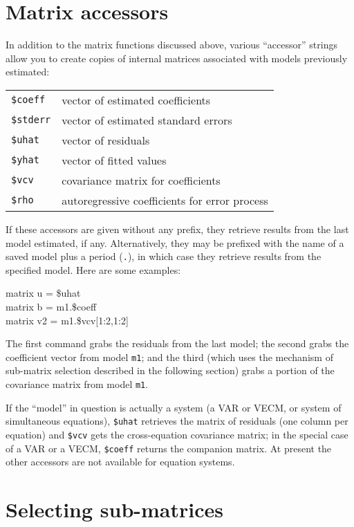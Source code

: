 \section{Matrix accessors}
\label{matrix-accessors}

In addition to the matrix functions discussed above,
various ``accessor'' strings allow you to create copies of internal
matrices associated with models previously estimated:

\begin{center}
\begin{tabular}{ll}
\texttt{\$coeff} & vector of estimated coefficients \\
\texttt{\$stderr} & vector of estimated standard errors \\
\texttt{\$uhat} & vector of residuals \\
\texttt{\$yhat} & vector of fitted values \\
\texttt{\$vcv} & covariance matrix for coefficients \\
\texttt{\$rho} & autoregressive coefficients for error process
\end{tabular}
\end{center}

If these accessors are given without any prefix, they retrieve results
from the last model estimated, if any.  Alternatively, they may be
prefixed with the name of a saved model plus a period (\texttt{.}), in
which case they retrieve results from the specified model.  Here are
some examples:
%
\begin{textcode}
matrix u = \$uhat\\
matrix b = m1.\$coeff\\
matrix v2 = m1.\$vcv[1:2,1:2]
\end{textcode}
%
The first command grabs the residuals from the last model; the second
grabs the coefficient vector from model \texttt{m1}; and the third
(which uses the mechanism of sub-matrix selection described in the
following section) grabs a portion of the covariance matrix from model
\texttt{m1}.

If the ``model'' in question is actually a system (a VAR or VECM, or
system of simultaneous equations), \texttt{\$uhat} retrieves the
matrix of residuals (one column per equation) and \texttt{\$vcv} gets
the cross-equation covariance matrix; in the special case of a VAR or
a VECM, \texttt{\$coeff} returns the companion matrix. At present the
other accessors are not available for equation systems.


\section{Selecting sub-matrices}
\label{matrix-sub}

